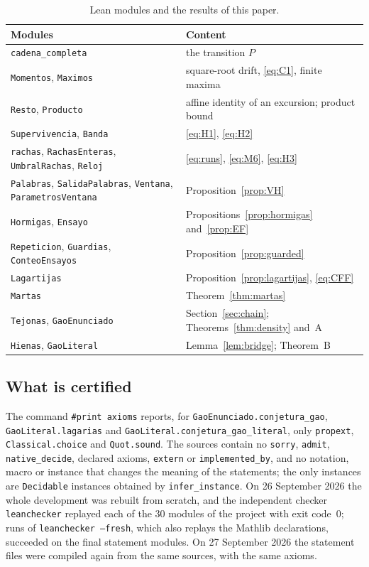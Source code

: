 \documentclass[11pt]{amsart}
\theoremstyle{definition}
\theoremstyle{remark}
\newcommand{\lean}[1]{\nolinkurl{#1}}
\begin{document}
\begin{table}[ht]
\caption{Lean modules and the results of this paper.}\label{tab:files}
\small
\begin{tabular}{@{}>{\raggedright\arraybackslash}p{}>{\raggedright\arraybackslash}p{}@{}}
\toprule
Modules & Content \\
\midrule
\lean{cadena_completa} & the transition $P$ \\
\texttt{Momentos}, \texttt{Maximos} & square-root drift, \eqref{eq:C1}, finite maxima \\
\texttt{Resto}, \texttt{Producto} & affine identity of an excursion; product bound \\
\texttt{Supervivencia}, \texttt{Banda} & \eqref{eq:H1}, \eqref{eq:H2} \\
\texttt{rachas}, \texttt{RachasEnteras}, \texttt{UmbralRachas}, \texttt{Reloj} & \eqref{eq:runs}, \eqref{eq:M6}, \eqref{eq:H3} \\
\texttt{Palabras}, \texttt{SalidaPalabras}, \texttt{Ventana}, \texttt{ParametrosVentana} & Proposition~\ref{prop:VH} \\
\texttt{Hormigas}, \texttt{Ensayo} & Propositions~\ref{prop:hormigas} and~\ref{prop:EF} \\
\texttt{Repeticion}, \texttt{Guardias}, \texttt{ConteoEnsayos} & Proposition~\ref{prop:guarded} \\
\texttt{Lagartijas} & Proposition~\ref{prop:lagartijas}, \eqref{eq:CFF} \\
\texttt{Martas} & Theorem~\ref{thm:martas} \\
\texttt{Tejonas}, \texttt{GaoEnunciado} & Section~\ref{sec:chain}; Theorems~\ref{thm:density} and~A \\
\texttt{Hienas}, \texttt{GaoLiteral} & Lemma~\ref{lem:bridge}; Theorem~B \\
\bottomrule
\end{tabular}
\end{table}

\subsection{What is certified}
The command \texttt{\#print axioms} reports, for \lean{GaoEnunciado.conjetura_gao}, \lean{GaoLiteral.lagarias} and \lean{GaoLiteral.conjetura_gao_literal}, only \texttt{propext}, \texttt{Classical.choice} and \texttt{Quot.sound}. The sources contain no \texttt{sorry}, \texttt{admit}, \lean{native_decide}, declared axioms, \texttt{extern} or \lean{implemented_by}, and no notation, macro or instance that changes the meaning of the statements; the only instances are \texttt{Decidable} instances obtained by \lean{infer_instance}. On 26 September 2026 the whole development was rebuilt from scratch, and the independent checker \texttt{leanchecker} replayed each of the $30$ modules of the project with exit code~$0$; runs of \texttt{leanchecker --fresh}, which also replays the Mathlib declarations, succeeded on the final statement modules. On 27 September 2026 the statement files were compiled again from the same sources, with the same axioms.
\end{document}
